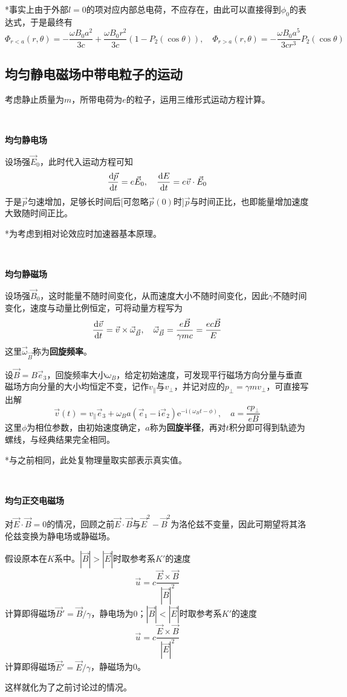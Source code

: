 \documentclass[a4paper,UTF8,fontset=windows]{ctexart}
\newcommand*{\dr}{\hspace{0.07em}\mathrm{d}}
\newcommand*{\er}{\mathrm{e}}
\newcommand*{\ir}{\mathrm{i}}
\newcommand*{\vb}{\vec{B}}
\newcommand*{\ve}{\vec{E}}
\newcommand*{\ves}{\vec{e}}
\newcommand*{\vps}{\vec{p}}
\newcommand*{\vus}{\vec{u}}
\newcommand*{\vvs}{\vec{v}}
\newcommand*{\vomega}{\vec{\omega}}
\newcommand*{\dt}[2][t]{\frac{\dr #2}{\dr #1}}
\begin{document}
*事实上由于外部$l=0$的项对应内部总电荷，不应存在，由此可以直接得到$\phi_0$的表达式，于是最终有
$$\Phi_{r<a}(r,\theta)=-\frac{\omega B_0a^2}{3c}+\frac{\omega B_0r^2}{3c}(1-P_2(\cos\theta)),\quad\Phi_{r>a}(r,\theta)=-\frac{\omega B_0a^5}{3cr^3}P_2(\cos\theta)$$

\subsection{均匀静电磁场中带电粒子的运动}
考虑静止质量为$m$，所带电荷为$e$的粒子，运用三维形式运动方程计算。

\

\textbf{均匀静电场}

设场强$\ve_0$，此时代入运动方程可知
$$\dt{\vps}=e\ve_0,\quad\dt{E}=e\vvs\cdot\ve_0$$
于是$\vps$匀速增加，足够长时间后[可忽略$\vps(0)$时]$\vps$与时间正比，也即能量增加速度大致随时间正比。

*为考虑到相对论效应时加速器基本原理。

\

\textbf{均匀静磁场}

设场强$\vb_0$，这时能量不随时间变化，从而速度大小不随时间变化，因此$\gamma$不随时间变化，速度与动量比例恒定，可将动量方程写为
$$\dt{\vvs}=\vvs\times\vomega_{\vb},\quad\vomega_{\vb}=\frac{e\vb}{\gamma mc}=\frac{ec\vb}{E}$$
这里$\vomega_{\vb}$称为\textbf{回旋频率}。

设$\vb=B\ves_3$，回旋频率大小$\omega_B$，给定初始速度，可发现平行磁场方向分量与垂直磁场方向分量的大小均恒定不变，记作$v_\parallel$与$v_\bot$，并记对应的$p_\bot=\gamma mv_\bot$，可直接写出解
$$\vvs(t)=v_\parallel\ves_3+\omega_Ba(\ves_1-\ir\ves_2)\er^{-\ir(\omega_Bt-\phi)},\quad a=\frac{cp_\bot}{eB}$$
这里$\phi$为相位参数，由初始速度确定，$a$称为\textbf{回旋半径}，再对$t$积分即可得到轨迹为螺线，与经典结果完全相同。

*与之前相同，此处复物理量取实部表示真实值。

\

\textbf{均匀正交电磁场}

对$\ve\cdot\vb=0$的情况，回顾之前$\ve\cdot\vb$与$\ve^2-\vb^2$为洛伦兹不变量，因此可期望将其洛伦兹变换为静电场或静磁场。

假设原本在$K$系中。$|\vb|>|\ve|$时取参考系$K'$的速度
$$\vus=c\frac{\ve\times\vb}{|\vb|^2}$$
计算即得磁场$\vb'=\vb/\gamma$，静电场为0；$|\vb|<|\ve|$时取参考系$K'$的速度
$$\vus=c\frac{\ve\times\vb}{|\ve|^2}$$
计算即得磁场$\ve'=\ve/\gamma$，静磁场为0。

这样就化为了之前讨论过的情况。
\end{document}
